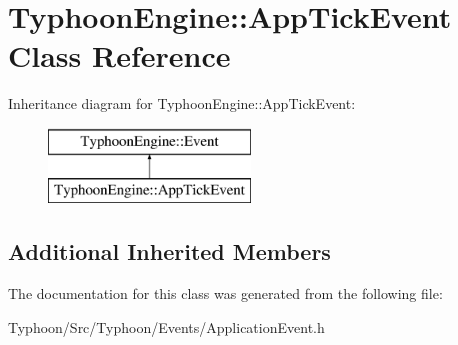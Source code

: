 \hypertarget{class_typhoon_engine_1_1_app_tick_event}{}\section{Typhoon\+Engine\+::App\+Tick\+Event Class Reference}
\label{class_typhoon_engine_1_1_app_tick_event}
Inheritance diagram for Typhoon\+Engine\+::App\+Tick\+Event\+:\begin{figure}[H]
\begin{center}
\leavevmode
\includegraphics[height=2.000000cm]{class_typhoon_engine_1_1_app_tick_event}
\end{center}
\end{figure}
\subsection*{Additional Inherited Members}


The documentation for this class was generated from the following file\+:\begin{DoxyCompactItemize}
\item 
Typhoon/\+Src/\+Typhoon/\+Events/Application\+Event.\+h\end{DoxyCompactItemize}
